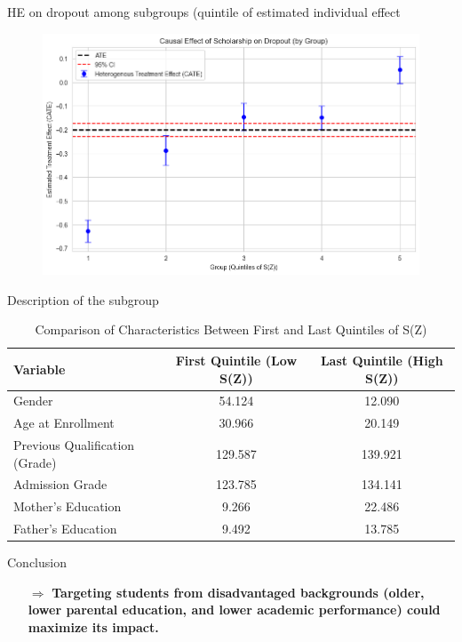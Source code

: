 \documentclass[aspectratio=169]{beamer}
\begin{document}
\begin{frame}{ HE on dropout among subgroups (quintile of estimated individual effect }

\begin{figure}[h]  
        \includegraphics[width=0.9\linewidth]{Tex_Pictures/HE_quintile_dropout.png}

 \end{figure}   
\end{frame}



\begin{frame}{Description of the subgroup}
\begin{table}[h]
    \centering
    \begin{tabular}{l c c}
        \hline
        \textbf{Variable} & \textbf{First Quintile (Low S(Z))} & \textbf{Last Quintile (High S(Z))} \\
        \hline
        Gender & 54.124 & 12.090 \\
        Age at Enrollment & 30.966 & 20.149 \\
        Previous Qualification (Grade) & 129.587 & 139.921 \\
        Admission Grade & 123.785 & 134.141 \\
        Mother’s Education & 9.266 & 22.486 \\
        Father’s Education & 9.492 & 13.785 \\
        \hline
    \end{tabular}
    \caption{Comparison of Characteristics Between First and Last Quintiles of S(Z)}
    \label{tab:quintile_comparison}
\end{table}


 \begin{exampleblock}{Conclusion}
\vspace{-1pt}
\begin{itemize}
    \item [$\Rightarrow$]
 \textbf{Targeting students from disadvantaged backgrounds (older, lower parental education, and lower academic performance) could maximize its impact.}
\end{itemize}
\vspace{-3pt}
	
\end{exampleblock}


\end{frame}
\end{document}
